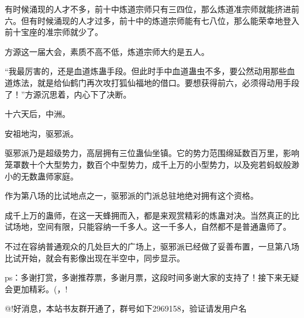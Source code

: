 \begin{this_body}
有时候涌现的人才不多，前十中炼道宗师只有三四位，那么炼道准宗师就能挤进前六。但有时候涌现的人才过多，前十中的炼道宗师能有七八位，那么能荣幸地登入前十宝座的准宗师就少了。

方源这一届大会，素质不高不低，炼道宗师大约是五人。

“我最厉害的，还是血道炼蛊手段。但此时手中血道蛊虫不多，要公然动用那些血道炼法，就是给仙鹤门再次攻打狐仙福地的借口。要想获得前六，必须得动用手段了！”方源沉思着，内心下了决断。

十六天后，中洲。

安祖地沟，驱邪派。

驱邪派乃是超级势力，高层拥有三位蛊仙坐镇。它的势力范围绵延数百万里，影响笼罩数十个大型势力，数百个中型势力，成千上万的小型势力，以及宛若蚂蚁般渺小的无数蛊师家庭。

作为第八场的比试地点之一，驱邪派的门派总驻地绝对拥有这个资格。

成千上万的蛊师，在这一天蜂拥而入，都是来观赏精彩的炼蛊对决。当然真正的比试场地，空间有限，只能容纳一千多人。这一千多人，自然都不是普通蛊师了。

不过在容纳普通观众的几处巨大的广场上，驱邪派已经做了妥善布置，一旦第八场比试开始，就会有影像出现在半空中，同步显示。

ps：多谢打赏，多谢推荐票，多谢月票，这段时间多谢大家的支持了！接下来无疑会更加精彩。(，!

@!好消息，本站书友群开通了，群号如下2969158，验证请发用户名

\end{this_body}


